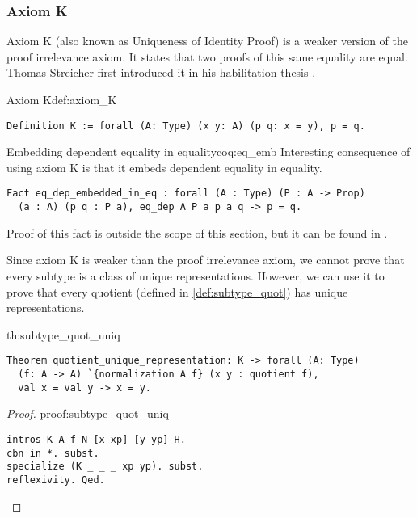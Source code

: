 \subsubsection{Axiom K}
Axiom K (also known as Uniqueness of Identity Proof) is a weaker version of the proof irrelevance axiom. It states that two proofs of this same equality are equal. Thomas Streicher first introduced it in his habilitation thesis \cite{Streicher}.
\begin{defi}{Axiom K}{def:axiom_K}
\begin{verbatim}
Definition K := forall (A: Type) (x y: A) (p q: x = y), p = q.
\end{verbatim}
\end{defi}
\begin{coq}{Embedding dependent equality in equality}{coq:eq_emb}
Interesting consequence of using axiom K is that it embeds dependent equality in equality.
\begin{verbatim}
Fact eq_dep_embedded_in_eq : forall (A : Type) (P : A -> Prop)
  (a : A) (p q : P a), eq_dep A P a p a q -> p = q.
\end{verbatim}
Proof of this fact is outside the scope of this section, but it can be found in .
\end{coq}
Since axiom K is weaker than the proof irrelevance axiom, we cannot prove that every subtype is a class of unique representations. However, we can use it to prove that every quotient (defined in \ref{def:subtype_quot}) has unique representations.
\begin{theo}{}{th:subtype_quot_uniq}
\begin{verbatim}
Theorem quotient_unique_representation: K -> forall (A: Type) 
  (f: A -> A) `{normalization A f} (x y : quotient f),
  val x = val y -> x = y.
\end{verbatim}
\end{theo}
\begin{proof}{}{proof:subtype_quot_uniq}
\begin{verbatim}
intros K A f N [x xp] [y yp] H. 
cbn in *. subst. 
specialize (K _ _ _ xp yp). subst. 
reflexivity. Qed.
\end{verbatim}
\end{proof}
